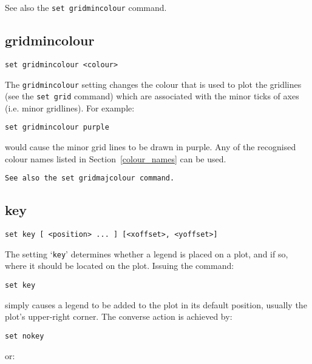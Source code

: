\documentclass[a4paper,onecolumn,11pt]{book}
\begin{document}
See also the {\tt set gridmincolour} command.


\subsection{gridmincolour}

\begin{verbatim}
set gridmincolour <colour>
\end{verbatim}

The {\tt gridmincolour} setting changes the colour that is used to plot the
gridlines (see the {\tt set grid} command) which are associated with the minor
ticks of axes (i.e. minor gridlines). For example:

\begin{verbatim}
set gridmincolour purple
\end{verbatim}

\noindent would cause the minor grid lines to be drawn in purple. Any of the recognised
colour names listed in Section~\ref{colour_names} can be used.

\begin{verbatim}
See also the set gridmajcolour command.
\end{verbatim}


\subsection{key}

\begin{verbatim}
set key [ <position> ... ] [<xoffset>, <yoffset>]
\end{verbatim}

The setting `{\tt key}' determines whether a legend is placed on a plot, and if
so, where it should be located on the plot. Issuing the command:

\begin{verbatim}
set key
\end{verbatim}

\noindent simply causes a legend to be added to the plot in its default position, usually
the plot's upper-right corner. The converse action is achieved by:

\begin{verbatim}
set nokey
\end{verbatim}

\noindent or:
\end{document}
